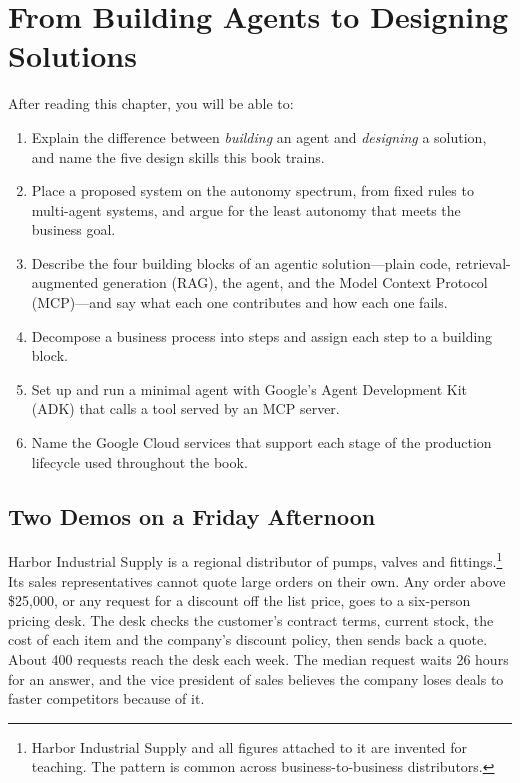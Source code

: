 
\chapter{From Building Agents to Designing Solutions}
\label{ch:foundations}

\begin{objectives}
After reading this chapter, you will be able to:
\begin{enumerate}[leftmargin=*,itemsep=2pt]
  \item Explain the difference between \emph{building} an agent and \emph{designing} a solution, and name the five design skills this book trains.
  \item Place a proposed system on the autonomy spectrum, from fixed rules to multi-agent systems, and argue for the least autonomy that meets the business goal.
  \item Describe the four building blocks of an agentic solution---plain code, retrieval-augmented generation (RAG), the agent, and the Model Context Protocol (MCP)---and say what each one contributes and how each one fails.
  \item Decompose a business process into steps and assign each step to a building block.
  \item Set up and run a minimal agent with Google's Agent Development Kit (ADK) that calls a tool served by an MCP server.
  \item Name the Google Cloud services that support each stage of the production lifecycle used throughout the book.
\end{enumerate}
\end{objectives}

\section{Two Demos on a Friday Afternoon}
\label{sec:two-demos}

Harbor Industrial Supply is a regional distributor of pumps, valves and fittings.\footnote{Harbor Industrial Supply and all figures attached to it are invented for teaching. The pattern is common across business-to-business distributors.} Its sales representatives cannot quote large orders on their own. Any order above \$25{,}000, or any request for a discount off the list price, goes to a six-person pricing desk. The desk checks the customer's contract terms, current stock, the cost of each item and the company's discount policy, then sends back a quote. About 400 requests reach the desk each week. The median request waits 26 hours for an answer, and the vice president of sales believes the company loses deals to faster competitors because of it.

